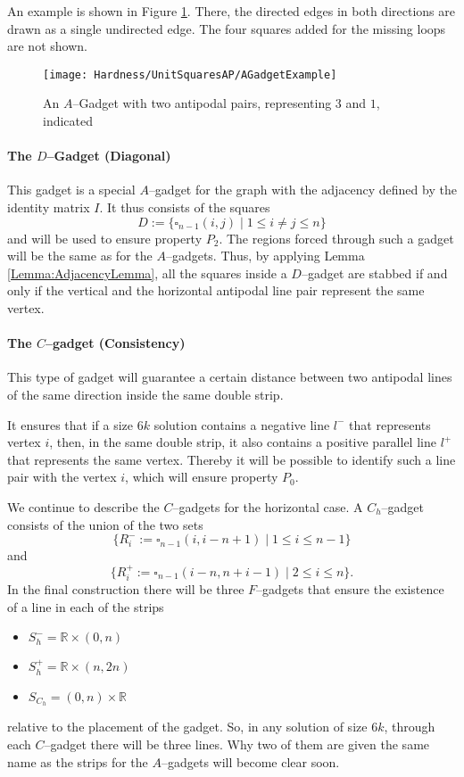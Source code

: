 \documentclass[12pt]{article}
\newcommand{\R}{\mathbb{R}}
\begin{document}
An example is shown in Figure \ref{fig:AGadgetExample}. There, the directed edges in both directions are drawn as a single undirected edge. The four squares added for the missing loops are not shown.  
\begin{figure}
	\centering
		\texttt{[image: Hardness/UnitSquaresAP/AGadgetExample]}
	\caption{An $A$--Gadget with two antipodal pairs, representing $3$ and $1$, indicated}
	\label{fig:AGadgetExample}
\end{figure}
\paragraph{The $D$--Gadget (Diagonal)}
This gadget is a special $A$--gadget for the graph with the adjacency defined by the identity matrix $I$. It thus consists of the squares
\[ D := \{\square_{n-1}(i, j) \mid 1 \leq i \neq j \leq n \} \]
and will be used to ensure property $P_2$. The regions forced through such a gadget will be the same as for the $A$--gadgets. Thus, by applying Lemma \ref{Lemma:AdjacencyLemma}, all the squares inside a $D$--gadget are stabbed if and only if the vertical and the horizontal antipodal line pair represent the same vertex.

\paragraph{The $C$--gadget (Consistency)}
This type of gadget will guarantee a certain distance between two antipodal lines of the same direction inside the same double strip. 

It ensures that if a size $6k$ solution contains a negative line $l^-$ that represents vertex $i$, then, in the same double strip, it also contains a positive parallel line $l^+$ that represents the same vertex. Thereby it will be possible to identify such a line pair with the vertex $i$, which will ensure property $P_0$.

We continue to describe the $C$--gadgets for the horizontal case. A $C_h$--gadget consists of the union of the two sets
\[ \{ R_i^- := \square_{n-1}(i, i - n + 1) \mid 1 \leq i \leq n-1 \} \]
and
\[ \{ R_i^+ := \square_{n-1}(i - n, n + i - 1) \mid 2 \leq i \leq n \}. \]
In the final construction there will be three $F$--gadgets that ensure the existence of a line in each of the strips
\begin{itemize}
	\item $S_h^- = \R \times (0, n)$ 
	\item $S_h^+ = \R \times (n, 2n)$
	\item $S_{C_h} = (0, n) \times \R$
\end{itemize}
relative to the placement of the gadget. So, in any solution of size $6k$, through each $C$--gadget there will be three lines. Why two of them are given the same name as the strips for the $A$--gadgets will become clear soon.
\end{document}

